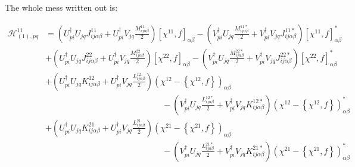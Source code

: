 \documentclass[a4paper,12pt]{book}
\begin{document}
The whole mess written out is:

\begin{align*}
\mathcal{H}_{(1),pq}^{11} &= \left(U_{pi}^\dagger U_{jq} J_{ij\alpha\beta}^{11} + U_{pi}^\dagger V_{jq} \frac{M_{ij\alpha\beta}^{11}}{2} \right)[\chi^{11},f]_{\alpha\beta} -
 \left(V_{pi}^\dagger U_{jq} \frac{M_{ij\alpha\beta}^{11*}}{2} + V_{pi}^\dagger V_{jq} J_{ij\alpha\beta}^{11*}  \right)[\chi^{11},f]^*_{\alpha\beta} \\
&+ \left(U_{pi}^\dagger U_{jq} J_{ij\alpha\beta}^{22} + U_{pi}^\dagger V_{jq} \frac{M_{ij\alpha\beta}^{22}}{2} \right)[\chi^{22},f]_{\alpha\beta} -
 \left(V_{pi}^\dagger U_{jq} \frac{M_{ij\alpha\beta}^{22*}}{2} + V_{pi}^\dagger V_{jq} J_{ij\alpha\beta}^{22*}  \right)[\chi^{22},f]^*_{\alpha\beta} \\
&+ \left(U_{pi}^\dagger U_{jq} K_{ij\alpha\beta}^{12} + U_{pi}^\dagger V_{jq} \frac{L_{ij\alpha\beta}^{12}}{2} \right)\left(\chi^{12}-\left\{\chi^{12},f\right\}\right)_{\alpha\beta} \\ &\qquad\qquad\qquad\qquad\qquad\qquad\qquad-
 \left(V_{pi}^\dagger U_{jq} \frac{L_{ij\alpha\beta}^{12*}}{2} + V_{pi}^\dagger V_{jq} K_{ij\alpha\beta}^{12*}  \right)\left(\chi^{12}-\left\{\chi^{12},f\right\}\right)^*_{\alpha\beta} \\
&+ \left(U_{pi}^\dagger U_{jq} K_{ij\alpha\beta}^{21} + U_{pi}^\dagger V_{jq} \frac{L_{ij\alpha\beta}^{21}}{2} \right)\left(\chi^{21}-\left\{\chi^{21},f\right\}\right)_{\alpha\beta} \\ &\qquad\qquad\qquad\qquad\qquad\qquad\qquad-
 \left(V_{pi}^\dagger U_{jq} \frac{L_{ij\alpha\beta}^{21*}}{2} + V_{pi}^\dagger V_{jq} K_{ij\alpha\beta}^{21*}  \right)\left(\chi^{21}-\left\{\chi^{21},f\right\}\right)^*_{\alpha\beta}
\end{align*}
\end{document}
